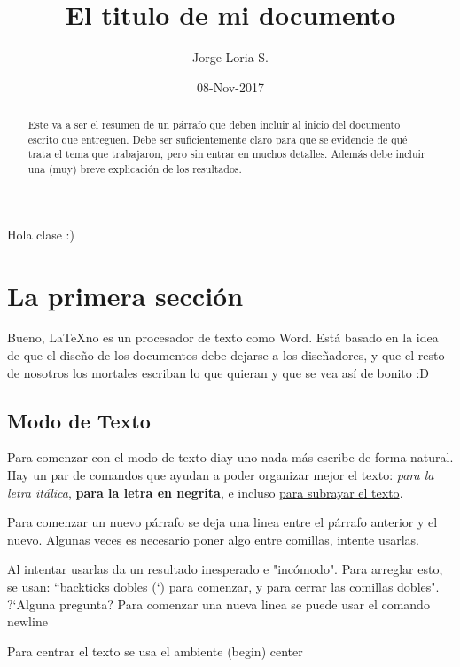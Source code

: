 \documentclass{article}
\title{El titulo de mi documento}
\author{Jorge Loria S.}
\date{08-Nov-2017} %
\begin{document}
\maketitle

Hola clase :) 



\begin{abstract}
Este va a ser el resumen de un p\'arrafo que deben incluir al inicio del documento escrito que entreguen. Debe ser suficientemente claro para que se evidencie de qu\'e trata el tema que trabajaron, pero sin entrar en muchos detalles. Adem\'as debe incluir una (muy) breve explicaci\'on de los resultados.
\end{abstract}

\section{La primera secci\'on}

Bueno, \LaTeX no es un procesador de texto como Word. Est\'a basado en la idea de que el dise\~no de los documentos debe dejarse a los dise\~nadores, y que el resto de nosotros los mortales escriban lo que quieran y que se vea as\'i de bonito :D 

\subsection{Modo de Texto}
Para comenzar con el modo de texto diay uno nada m\'as escribe de forma natural. Hay un par de comandos que ayudan a poder organizar mejor el texto: \textit{para la letra it\'alica}, \textbf{para la letra en negrita}, e incluso \underline{para subrayar el texto}. 

Para comenzar un nuevo p\'arrafo se deja una linea entre el p\'arrafo anterior y el nuevo. Algunas veces es necesario poner algo entre comillas, intente usarlas. %

Al intentar usarlas da un resultado inesperado e "inc\'omodo". Para arreglar esto, se usan: ``backticks dobles (`) para comenzar, y para cerrar las comillas dobles". ?`Alguna pregunta? \newline
Para comenzar una nueva linea se puede usar el comando newline\newline
\begin{center}
Para centrar el texto se usa el ambiente (begin) center
\end{center}
\end{document}
